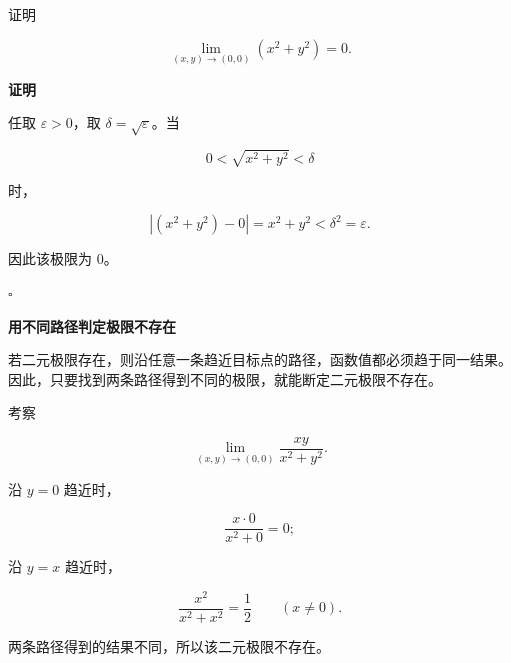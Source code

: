 \documentclass[fontset=fandol]{ctexart}
\newenvironment{custom}[1]{\par\noindent\textbf{#1}\quad}{\par\vspace{0.8em}}
\newenvironment{proofdetail}{\par\noindent\textbf{证明}\quad}{\hfill$\square$\par\vspace{0.8em}}
\begin{document}
\begin{example}[按定义证明二元极限]

	证明

	\[

	\lim_{(x,y)\to(0,0)}(x^2+y^2)=0.

	\]

\end{example}

\begin{proofdetail}

	任取 \(\varepsilon>0\)，取 \(\delta=\sqrt{\varepsilon}\)。当

	\[

	0<\sqrt{x^2+y^2}<\delta

	\]

	时，

	\[

	|(x^2+y^2)-0|=x^2+y^2<\delta^2=\varepsilon.

	\]

	因此该极限为 \(0\)。

\end{proofdetail}



\begin{custom}{用不同路径判定极限不存在}

	若二元极限存在，则沿任意一条趋近目标点的路径，函数值都必须趋于同一结果。因此，只要找到两条路径得到不同的极限，就能断定二元极限不存在。

\end{custom}



\begin{example}[两条路径给出不同结果]

	考察

	\[

	\lim_{(x,y)\to(0,0)}\frac{xy}{x^2+y^2}.

	\]

	沿 \(y=0\) 趋近时，

	\[

	\frac{x\cdot0}{x^2+0}=0;

	\]

	沿 \(y=x\) 趋近时，

	\[

	\frac{x^2}{x^2+x^2}=\frac12\qquad(x\neq0).

	\]

	两条路径得到的结果不同，所以该二元极限不存在。

\end{example}
\end{document}

